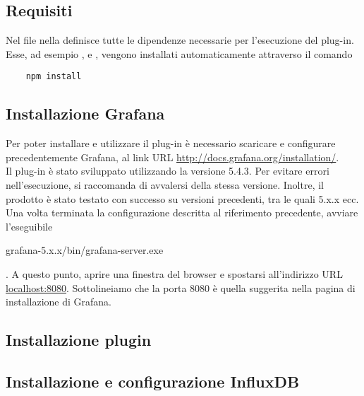 \subsection{Requisiti}
Nel file  nella  definisce tutte le dipendenze necessarie per l'esecuzione del plug-in.
Esse, ad esempio ,  e , vengono installati automaticamente attraverso il comando
\begin{verbatim}
	npm install
\end{verbatim}
\subsection{Installazione Grafana}
Per poter installare e utilizzare il plug-in è necessario scaricare e configurare precedentemente Grafana, al link URL \url{http://docs.grafana.org/installation/}. \\
Il plug-in è stato sviluppato utilizzando la versione 5.4.3. Per evitare errori nell'esecuzione, si raccomanda di avvalersi della stessa versione. Inoltre, il prodotto è stato testato con successo su versioni precedenti, tra le quali 5.x.x ecc.
Una volta terminata la configurazione descritta al riferimento precedente, avviare l'eseguibile \begin{ttfamily}
	grafana-5.x.x/bin/grafana-server.exe
\end{ttfamily}.
A questo punto, aprire una finestra del browser e spostarsi all'indirizzo URL \url{localhost:8080}. Sottolineiamo che la porta 8080 è quella suggerita nella pagina di installazione di Grafana.
\subsection{Installazione plugin}
\subsection{Installazione e configurazione InfluxDB}